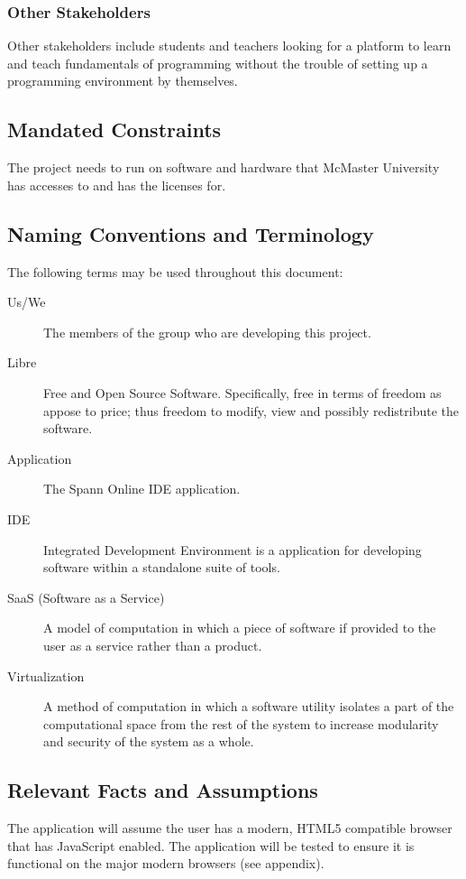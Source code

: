 \documentclass[12pt, titlepage]{article}
\begin{document}
    \subsubsection{Other Stakeholders}
		Other stakeholders include students and teachers looking for a platform to
		learn and teach fundamentals of programming without the trouble of setting
		up a programming environment by themselves.

  \subsection{Mandated Constraints}
  The project needs to run on software and hardware that McMaster University
  has accesses to and has the licenses for.

  \subsection{Naming Conventions and Terminology}
	The following terms may be used throughout this document:

	\begin{description}
		\item [Us/We] The members of the group who are developing this project.
		\item [Libre] Free and Open Source Software. Specifically, free in terms of
			freedom as appose to price; thus freedom to modify, view and possibly
			redistribute the software.
		\item [Application] The Spann Online IDE application.
		\item [IDE] Integrated Development Environment is a application for
			developing software within a standalone suite of tools.
		\item [SaaS (Software as a Service)] A model of computation in which a piece
			of software if provided to the user as a service rather than a product.
		\item [Virtualization] A method of computation in which a software utility
			isolates a part of the computational space from the rest of the system to
			increase modularity and security of the system as a whole.
	\end{description}

  \subsection{Relevant Facts and Assumptions}
  The application will assume the user has a modern, HTML5 compatible browser
  that has JavaScript enabled. The application will be tested to ensure it is
	functional on the major modern browsers (see appendix).
\end{document}
